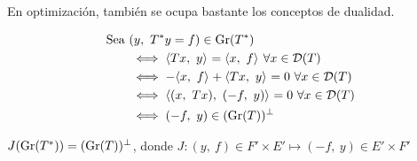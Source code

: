 En optimización, también se ocupa bastante los conceptos de dualidad.

\begin{note}

\begin{align*}
\text{Sea } &(y,\ T\adj y = f) \in \gr (T\adj) \\
&\iff \prodint[]{Tx}{y} = \prodint[]{x}{f} \ \forall x \in \cd(T) \\
&\iff -\prodint[]{x}{f} + \prodint[]{Tx}{y} = 0 \ \forall x \in \cd(T) \\
&\iff  \prodint[]{(x,\ Tx)}{(-f,\ y)}  = 0 \ \forall x \in \cd(T) \\
&\iff  (-f,\ y) \in (\gr (T))\ort 
\end{align*}

$J(\gr (T\adj)) = (\gr (T))\ort $, donde $J: (y,\ f) \in  F' \times E' \mapsto (-f,\ y) \in E' \times F'$

\end{note}












